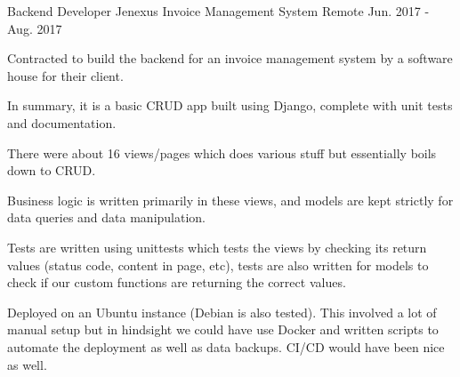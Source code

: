 

\begin{cventries}
  \cventry
    {Backend Developer} %
    {Jenexus Invoice Management System} %
    {Remote} %
    {Jun. 2017 - Aug. 2017} %
    {
      \begin{cvitems} %
        \item {Contracted to build the backend for an invoice management system by a software house for their client.}
        \item {In summary, it is a basic CRUD app built using Django, complete with unit tests and documentation.}
        \item {There were about 16 views/pages which does various stuff but essentially boils down to CRUD.}
        \item {Business logic is written primarily in these views, and models are kept strictly for data queries and data manipulation.}
        \item {Tests are written using unittests which tests the views by checking its return values (status code, content in page, etc), tests are also written for models to check if our custom functions are returning the correct values.}
        \item {Deployed on an Ubuntu instance (Debian is also tested). This involved a lot of manual setup but in hindsight we could have use Docker and written scripts to automate the deployment as well as data backups. CI/CD would have been nice as well.}
      \end{cvitems}
    }
\end{cventries}
